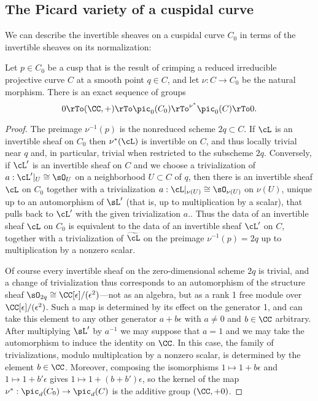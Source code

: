 \subsection{The Picard variety of a cuspidal curve}

We can describe the invertible sheaves on a cuspidal curve $C_{0}$ in terms of the invertible sheaves on its
normalization:

\begin{proposition}\label{torsion-free on cuspidal}
Let $p\in C_{0}$ be a cusp that is the result of crimping a reduced irreducible projective curve $C$ at a smooth point $q\in C$,
and let $\nu: C\to C_{0}$ be the natural morphism.
There is an exact sequence of groups
$$
0 \rTo (\CC,+) \rTo \pic_0(C_{0}) \rTo^{\nu^*} \pic_0(C) \rTo 0.
$$
\end{proposition}

\begin{proof}
The preimage $\nu^{-1}(p)$ is the nonreduced scheme $2q \subset C$. If $\cL$ is an invertible sheaf on 
$C_{0}$ then $\nu^{*}(\cL)$ is invertible on $C$, and thus locally trivial near $q$ and, in particular, trivial
when restricted to the subscheme $2q$. Conversely,
if $\cL'$ is an invertible sheaf on $C$ and we choose a trivialization of $a: \cL'|_{U}\cong \sO_{U}$ on a neighborhood $ U\subset C$
of $q$, then there is an invertible sheaf $\cL$ on $C_{0}$ together with a  trivialization
$a: \cL|_{\nu(U)}\cong \sO_{\nu(U)}$
on $\nu(U)$, unique up to an automorphism of $\sL'$ (that is, up to multiplication by a scalar), that
pulls back to $\cL'$ with the given trivialization $a$..
Thus the data of an invertible sheaf $\cL$ on $C_0$ is equivalent to the data of an invertible sheaf $\cL'$ on $C$, together with a trivialization of $\widetilde \cL$ on the preimage $\nu^{-1}(p) = 2q$ up to multiplication by a nonzero scalar.

Of course every invertible sheaf on the zero-dimensional scheme $2q$ is trivial, and a change of trivialization
thus corresponds to an automorphism of the structure sheaf $\sO_{2q} \cong \CC[\epsilon]/(\epsilon^{2})$---not as an algebra, but as a rank 1 free module over $\CC[\epsilon]/(\epsilon^{2})$. Such a map is determined by
its effect on the generator 1, and can take this element to any other generator $a+b\epsilon$ with
$a\neq 0$ and $b\in \CC$ arbitrary. After multiplying $\sL'$ by $a^{-1}$
we may suppose that $a =1$ and we may take the automorphism to induce the identity on $\CC$.
In this case, the family of trivializations, modulo multiplcation by a nonzero scalar, is 
determined by the element $b\in \CC$. Moreover, composing the isomorphisms
$1\mapsto 1+b\epsilon$ and $1\mapsto 1+b'\epsilon$  gives $1\mapsto 1+(b+b')\epsilon$,
so the kernel of the map $\nu^{*}: \pic_{d}(C_{0}) \to \pic_{d}(C)$ is 
the additive group $(\CC, +0)$.
\end{proof}

